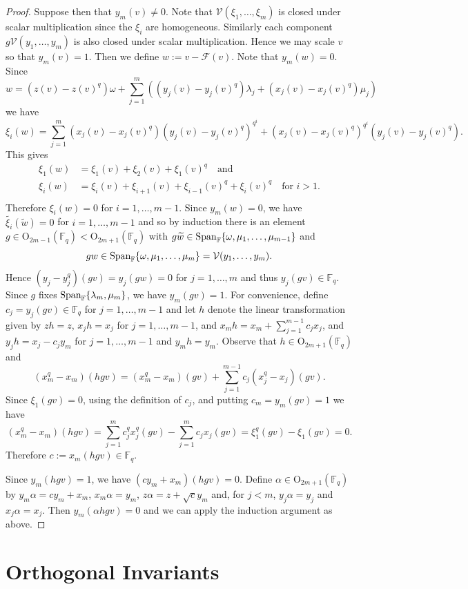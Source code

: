 \documentclass{amsart}
\newcommand{\field}{\mathbb{F}}
\newcommand{\orth}[2]{{{\text{O}_{{#1}}(\field_{#2})}}}
\newcommand{\V}{\mathcal{V}}
\newcommand{\frob}{\mathcal{F}}
\newcommand{\basise}{\lambda}
\newcommand{\basisf}{\mu}
\begin{document}
\begin{proof}
Suppose then that $y_m(v)\not=0$.  
Note that $\V(\xi_1,\ldots,\xi_{m})$ is closed under scalar 
multiplication since the $\xi_i$ are homogeneous.  
Similarly each 
component $g\V(y_1,\ldots,y_m)$ is also closed under scalar
multiplication.  Hence we may scale $v$ so that $y_m(v)=1$.
Then we define $w:=v-\frob(v)$. Note that $y_m(w)=0$.
Since $$w=(z(v)-z(v)^q)\omega
+\sum_{j=1}^m\left( (y_j(v)-y_j(v)^q)\basise_j+(x_j(v)-x_j(v)^q)\basisf_j\right)$$
we have
$$\xi_i(w)=\sum_{j=1}^m (x_j(v)-x_j(v)^q)(y_j(v)-y_j(v)^q)^{q^i}
      +(x_j(v)-x_j(v)^q)^{q^i}(y_j(v)-y_j(v)^q).$$
This gives 
\begin{align*}
\xi_1(w)&=\xi_1(v)+\xi_{2}(v)+\xi_1(v)^q\quad
\text{and}\\
\xi_i(w)&=\xi_i(v)+\xi_{i+1}(v)+\xi_{i-1}(v)^q+\xi_i(v)^q
\quad\text{for }i>1.\\
\end{align*}
Therefore $\xi_i(w)=0$ for $i=1,\ldots,m-1$.
Since $y_m(w)=0$, we have $\widetilde{\xi_i}(\widetilde{w})=0$ for $i=1,\ldots, m-1$ and so by induction
there is an element $g\in\orth{2m-1}{q}<\orth{2m+1}{q}$
with $g\widetilde{w}\in 
{\rm Span}_{\field}\{\omega,\basisf_1,\ldots,\basisf_{m-1}\}$ and 
$$gw\in {\rm Span}_{\field}\{\omega,\basisf_1,\ldots,\basisf_m\}
=\V(y_1,\ldots,y_m).$$
Hence $(y_j-y_j^q)(gv)=y_j(gw)=0$ for $j=1,\ldots,m$ and thus $y_j(gv)\in\field_q$.
Since $g$ fixes ${\rm Span}_{\field}\{\basise_m,\basisf_m\}$, we have $y_m(gv)=1$.
For convenience, define $c_j=y_j(gv)\in\field_q$ for $j=1,\ldots,m-1$ and let $h$ denote the linear transformation
given by $zh=z$, $x_jh=x_j$ for $j=1,\ldots,m-1$, and 
$x_mh=x_m+\sum_{j=1}^{m-1} c_jx_j$, and 
$y_jh=x_j-c_jy_m$ for $j=1,\ldots,m-1$
and $y_mh=y_m$. 
Observe that $h\in\orth{2m+1}{q}$
and  $$(x_m^q-x_m)(hgv)=(x_m^q-x_m)(gv)+\sum_{j=1}^{m-1} c_j(x_j^q-x_j)(gv).$$
Since  $\xi_1(gv)=0$, using the definition of $c_j$, and putting $c_m=y_m(gv)=1$ 
we have $$
(x_m^q-x_m)(hgv)
=\sum_{j=1}^m c_j^q x_j^q (gv) - \sum_{j=1}^m c_j x_j (gv)
=\xi_1^q(gv) - \xi_1(gv) = 0.$$
Therefore $c:=x_m(hgv)\in\field_q$. 

Since $y_m(hgv)=1$, we have $(cy_m+x_m)(hgv)=0$.
Define $\alpha\in\orth{2m+1}{q}$ by $y_m\alpha=cy_m+x_m$,
$x_m\alpha=y_m$, $z\alpha=z+\sqrt{c}y_m$ and, for $j<m$, 
$y_j\alpha=y_j$ and $x_j\alpha=x_j$.
Then $y_m(\alpha h g v)=0$ and we can apply the induction argument as above.
\end {proof}


\section{Orthogonal Invariants}\label{orth_invs}
\end{document}
